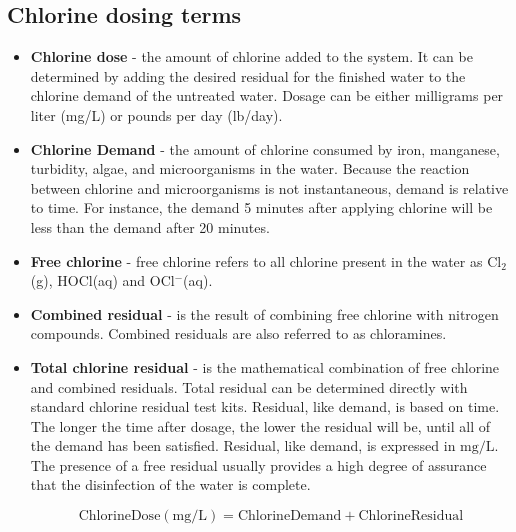 \subsection{Chlorine dosing terms}
\begin{itemize}
\item \textbf{Chlorine dose} - the amount of chlorine added to the system. It can be determined by adding the desired residual for the finished water to the chlorine demand of the untreated water. Dosage can be either milligrams per liter (mg/L) or pounds per day (lb/day).

\item \textbf{Chlorine Demand} - the amount of chlorine consumed by iron, manganese, turbidity, algae, and microorganisms in the water. Because the reaction between chlorine and microorganisms is not instantaneous, demand is relative to time. For instance, the demand 5 minutes after applying chlorine will be less than the demand after 20 minutes. 

\item \textbf{Free chlorine} - free chlorine refers to all chlorine present in the water as Cl$_2$(g), HOCl(aq) and OCl$^-$(aq).

\item \textbf{Combined residual} - is the result of combining free chlorine with nitrogen compounds. Combined residuals are also referred to as chloramines. 

\item \textbf{Total chlorine residual} - is the mathematical combination of free chlorine and combined residuals. Total residual can be determined directly with standard chlorine residual test kits.  Residual, like demand, is based on time. The longer the time after dosage, the lower the residual will be, until all of the demand has been satisfied. Residual, like demand, is expressed in $\mathrm{mg} / \mathrm{L}$. The presence of a free residual usually provides a high degree of assurance that the disinfection of the water is complete. 

$$\mathrm{Chlorine Dose} (\mathrm{mg} / \mathrm{L})= \mathrm{Chlorine Demand}+ \mathrm{ Chlorine Residual}$$






\end{itemize}
